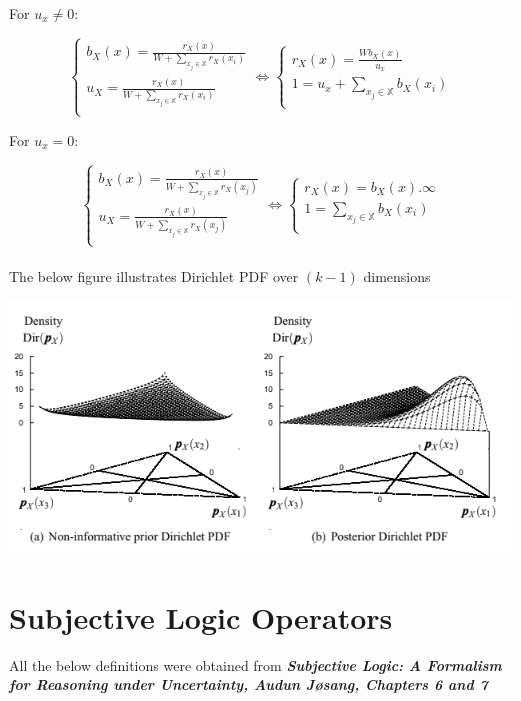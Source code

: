 \documentclass[UTF8]{article}
\newcommand{\mycite}[1]{\textbf{\textit{#1}}}
\begin{document}
For $u_x \neq 0$:

$$
\begin{cases}
    b_X(x) = \frac{r_X(x)}{W + \sum_{x_j \in \mathbb{X}} r_X(x_i)}\\
    u_X = \frac{r_X(x)}{W + \sum_{x_j \in \mathbb{X}} r_X(x_i)}\\
\end{cases}
\Leftrightarrow
\begin{cases}
    r_X(x) = \frac{Wb_X(x)}{u_x}\\
    1 = u_x + \sum_{x_j \in \mathbb{X}} b_X(x_i)\\
\end{cases}
$$

For $u_x = 0$:

$$
\begin{cases}
    b_X(x) = \frac{r_X(x)}{W + \sum_{x_j \in \mathbb{X}} r_X(x_j)}\\
    u_X = \frac{r_X(x)}{W + \sum_{x_j \in \mathbb{X}} r_X(x_j)}\\
\end{cases}
\Leftrightarrow
\begin{cases}
    r_X(x) = b_X(x) . \infty\\
    1 = \sum_{x_j \in \mathbb{X}} b_X(x_i)\\
\end{cases}
$$
\\
The below figure illustrates Dirichlet PDF over $(k - 1)$ dimensions
\begin{center}
    \includegraphics[width=6in]{images/dirich.png}
\end{center}
\section{Subjective Logic Operators}

All the below definitions were obtained from \mycite{Subjective Logic: A Formalism for Reasoning under Uncertainty, Audun Jøsang, Chapters 6 and 7}\\
\end{document}
